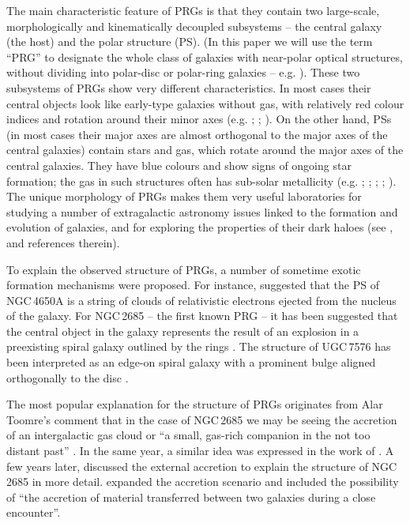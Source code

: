 \documentclass{raa}
\begin{document}
The main characteristic feature of PRGs is that they contain two large-scale, 
morphologically and kinematically decoupled subsystems --
the central galaxy (the host) and the polar structure (PS). 
(In this paper we will use the term ``PRG'' to designate the whole
class of galaxies with near-polar optical structures, without
dividing into polar-disc or polar-ring galaxies -- e.g. \citealt{iodice2014}).
These two subsystems of PRGs show very different characteristics.
In most cases their central objects look like early-type galaxies 
without gas, with relatively red colour indices
and rotation around their minor axes (e.g. \citealt{whit1987};
\citealt{fink2012}; \citealt{rc2015}). On the other hand, PSs 
(in most cases their major axes are almost orthogonal to the major axes 
of the central galaxies) contain stars and gas, which rotate around the 
major axes of the central galaxies. They have blue colours and 
show signs of ongoing star formation; the gas in 
such structures often has sub-solar metallicity (e.g. \citealt{whit1987};
\citealt{vg1987}; \citealt{rc1994,rc2015}; \citealt{iodice2002}; 
\citealt{em2019}). The unique morphology of PRGs makes them very useful laboratories 
for studying a number of extragalactic astronomy issues linked to the formation and 
evolution of galaxies, and for exploring the properties of their dark haloes
(see \citealt{khop2014}, \citealt{comb2014} and references therein).

To explain the observed structure of PRGs, a number of sometime exotic formation mechanisms were 
proposed. For instance, \citet{sersic1967} 
suggested that the PS of NGC\,4650A is a string
of clouds of relativistic electrons ejected from the nucleus of the
galaxy. For NGC\,2685 -- the first known PRG \citep{bb1959} --
it has been suggested that the central object in the galaxy represents the 
result of an explosion in a preexisting spiral galaxy outlined by the 
rings \citep{gk1979}. The structure of UGC\,7576 has been interpreted as
an edge-on spiral galaxy with a prominent bulge aligned orthogonally to
the disc \citep{mould1982}.

The most popular explanation for the structure of PRGs originates from 
Alar Toomre's comment that in the case of NGC\,2685 we may be seeing
the accretion of an intergalactic gas cloud or ``a small, gas-rich 
companion in the not too distant past'' \citep{toomre1977}. 
In the same year, a similar idea was expressed in the work of 
\cite{knapp1977}. A few years later, \cite{shane1980} discussed the 
external accretion to explain the structure of NGC\,2685 in more detail. 
\cite{schw1983} expanded the accretion scenario and included the possibility 
of ``the accretion of material transferred between two galaxies during a close
encounter''. 
\end{document}
